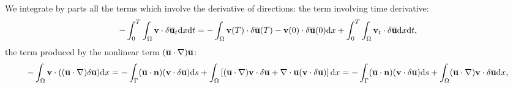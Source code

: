 \documentclass[oneside,11pt]{book}
\numberwithin{equation}{section}
\begin{document}
We integrate by parts all the terms which involve the derivative of directions: the term involving time derivative:
\begin{align*}
    -\int_0^T\int_\Omega {\bf v}\cdot\delta\overline{\bf u}_t{\rm d}x{\rm d}t = -\int_\Omega {\bf v}(T)\cdot\delta\overline{\bf u}(T) - {\bf v}(0)\cdot\delta\overline{\bf u}(0){\rm d}x + \int_0^T\int_\Omega {\bf v}_t\cdot\delta\overline{\bf u}{\rm d}x{\rm d}t,
\end{align*}
the term produced by the nonlinear term $(\overline{\bf u}\cdot\nabla)\overline{\bf u}$:
\begin{align*}
    -\int_\Omega {\bf v}\cdot((\overline{\bf u}\cdot\nabla)\delta\overline{\bf u}){\rm d}x = -\int_\Gamma (\overline{\bf u}\cdot{\bf n})({\bf v}\cdot\delta\overline{\bf u}){\rm d}s + \int_\Omega \left[(\overline{\bf u}\cdot\nabla){\bf v}\cdot\delta\overline{\bf u} + \nabla\cdot\overline{\bf u}({\bf v}\cdot\delta\overline{\bf u})\right]{\rm d}x = -\int_\Gamma (\overline{\bf u}\cdot{\bf n})({\bf v}\cdot\delta\overline{\bf u}){\rm d}s + \int_\Omega (\overline{\bf u}\cdot\nabla){\bf v}\cdot\delta\overline{\bf u}{\rm d}x,
\end{align*}
\end{document}
